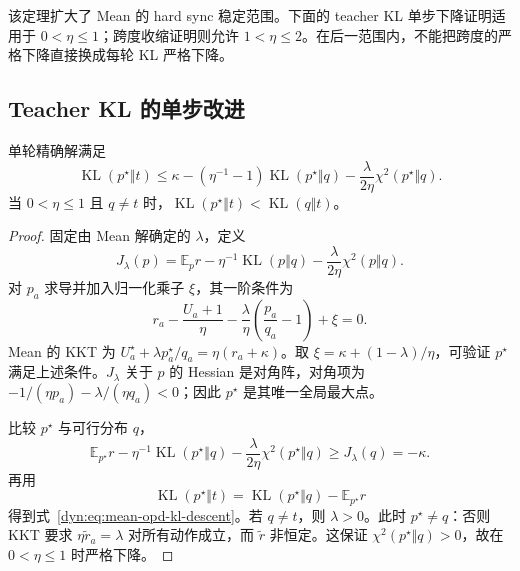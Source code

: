 \documentclass[lang=cn,scheme=chinese,openany]{../book/elegantbook}
\newcommand{\E}{\mathbb E}
\newcommand{\KL}{\operatorname{KL}}
\begin{document}
该定理扩大了 Mean 的 hard sync 稳定范围。下面的 teacher KL 单步下降证明适用于 $0<\eta\le1$；跨度收缩证明则允许 $1<\eta\le2$。在后一范围内，不能把跨度的严格下降直接换成每轮 KL 严格下降。

\subsection{Teacher KL 的单步改进}

\begin{proposition}
\label{dyn:prop:mean-opd-kl-descent}
单轮精确解满足
\begin{equation}
 \KL(p^\star\Vert t)
 \le\kappa-\left(\eta^{-1}-1\right)\KL(p^\star\Vert q)
       -\frac{\lambda}{2\eta}\chi^2(p^\star\Vert q).
 \label{dyn:eq:mean-opd-kl-descent}
\end{equation}
当 $0<\eta\le1$ 且 $q\ne t$ 时，$\KL(p^\star\Vert t)<\KL(q\Vert t)$。
\end{proposition}

\begin{proof}
固定由 Mean 解确定的 $\lambda$，定义
\begin{equation*}
 J_\lambda(p)=\E_pr-\eta^{-1}\KL(p\Vert q)
                    -\frac{\lambda}{2\eta}\chi^2(p\Vert q).
\end{equation*}
对 $p_a$ 求导并加入归一化乘子 $\xi$，其一阶条件为
\begin{equation*}
 r_a-\frac{U_a+1}{\eta}
 -\frac{\lambda}{\eta}\left(\frac{p_a}{q_a}-1\right)+\xi=0.
\end{equation*}
Mean 的 KKT 为 $U_a^\star+\lambda p_a^\star/q_a=\eta(r_a+\kappa)$。取 $\xi=\kappa+(1-\lambda)/\eta$，可验证 $p^\star$ 满足上述条件。$J_\lambda$ 关于 $p$ 的 Hessian 是对角阵，对角项为 $-1/(\eta p_a)-\lambda/(\eta q_a)<0$；因此 $p^\star$ 是其唯一全局最大点。

比较 $p^\star$ 与可行分布 $q$，
\begin{equation*}
 \E_{p^\star}r-\eta^{-1}\KL(p^\star\Vert q)
 -\frac{\lambda}{2\eta}\chi^2(p^\star\Vert q)
 \ge J_\lambda(q)=-\kappa.
\end{equation*}
再用
\begin{equation*}
 \KL(p^\star\Vert t)=\KL(p^\star\Vert q)-\E_{p^\star}r
\end{equation*}
得到式~\eqref{dyn:eq:mean-opd-kl-descent}。若 $q\ne t$，则 $\lambda>0$。此时 $p^\star\ne q$：否则 KKT 要求 $\eta \widetilde r_a=\lambda$ 对所有动作成立，而  $\widetilde r$ 非恒定。这保证 $\chi^2(p^\star\Vert q)>0$，故在 $0<\eta\le1$ 时严格下降。
\end{proof}
\end{document}
